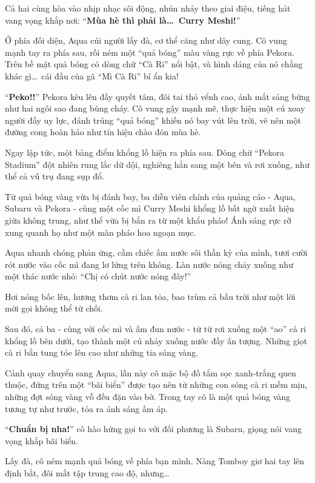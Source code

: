 \documentclass[../main.tex]{subfiles}
\begin{document}
Cả hai cùng hòa vào nhịp nhạc sôi động, nhún nhảy theo giai điệu, tiếng hát vang vọng khắp nơi: ``\textbf{Mùa hè thì phải là\dots\ Curry Meshi!}''

Ở phía đối diện, Aqua cúi người lấy đà, cơ thể căng như dây cung. Cô vung mạnh tay ra phía sau, rồi ném một ``quả bóng'' màu vàng rực về phía Pekora. Trên bề mặt quả bóng có dòng chữ ``Cà Ri'' nổi bật, và hình dáng của nó chẳng khác gì\dots\ cái đầu của gã ``Mì Cà Ri'' bí ẩn kia!

``\textbf{Peko!!}'' Pekora kêu lên đầy quyết tâm, đôi tai thỏ vểnh cao, ánh mắt sáng bừng như hai ngôi sao đang bùng cháy. Cô vung gậy mạnh mẽ, thực hiện một cú xoay người đầy uy lực, đánh trúng ``quả bóng'' khiến nó bay vút lên trời, vẽ nên một đường cong hoàn hảo như tín hiệu chào đón mùa hè.

Ngay lập tức, một bảng điểm khổng lồ hiện ra phía sau. Dòng chữ ``Pekora Stadium'' đột nhiên rung lắc dữ dội, nghiêng hẳn sang một bên và rơi xuống, như thể cả vũ trụ đang sụp đổ.


Từ quả bóng vàng vừa bị đánh bay, ba diễn viên chính của quảng cáo - Aqua, Subaru và Pekora - cùng một cốc mì Curry Meshi khổng lồ bất ngờ xuất hiện giữa không trung, như thể vừa bị bắn ra từ một khẩu pháo! Ánh sáng rực rỡ xung quanh họ như một màn pháo hoa ngoạn mục.

Aqua nhanh chóng phản ứng, cầm chiếc ấm nước sôi thần kỳ của mình, tươi cười rót nước vào cốc mì đang lơ lửng trên không. Làn nước nóng chảy xuống như một thác nước nhỏ: ``Chị có chút nước nóng đây!''

Hơi nóng bốc lên, hương thơm cà ri lan tỏa, bao trùm cả bầu trời như một lời mời gọi không thể từ chối.

Sau đó, cả ba - cùng với cốc mì và ấm đun nước - từ từ rơi xuống một ``ao'' cà ri khổng lồ bên dưới, tạo thành một cú nhảy xuống nước đầy ấn tượng. Những giọt cà ri bắn tung tóe lên cao như những tia sáng vàng.


Cảnh quay chuyển sang Aqua, lần này cô mặc bộ đồ tắm sọc xanh-trắng quen thuộc, đứng trên một ``bãi biển'' được tạo nên từ những con sóng cà ri mềm mịn, những đợt sóng vàng vỗ đều đặn vào bờ. Trong tay cô là một quả bóng vàng tương tự như trước, tỏa ra ánh sáng ấm áp.

``\textbf{Chuẩn bị nha!}'' cô hào hứng gọi to với đối phương là Subaru, giọng nói vang vọng khắp bãi biển.

Lấy đà, cô ném mạnh quả bóng về phía bạn mình. Nàng Tomboy giơ hai tay lên định bắt, đôi mắt tập trung cao độ, nhưng\dots
\end{document}
